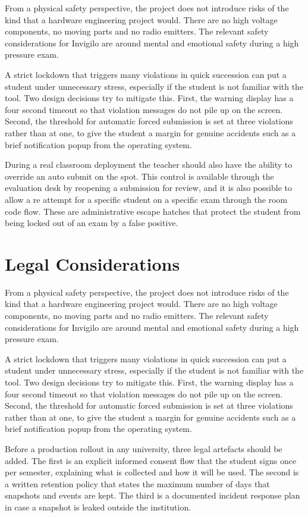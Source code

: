 \documentclass[12pt, a4paper]{report}
\begin{document}
\begin{justify}
  {\fontsize{12}{18}\selectfont
    From a physical safety perspective, the project does not introduce risks of the kind that a hardware engineering project would. There are no high voltage components, no moving parts and no radio emitters. The relevant safety considerations for Invigilo are around mental and emotional safety during a high pressure exam.

    A strict lockdown that triggers many violations in quick succession can put a student under unnecessary stress, especially if the student is not familiar with the tool. Two design decisions try to mitigate this. First, the warning display has a four second timeout so that violation messages do not pile up on the screen. Second, the threshold for automatic forced submission is set at three violations rather than at one, to give the student a margin for genuine accidents such as a brief notification popup from the operating system.

    During a real classroom deployment the teacher should also have the ability to override an auto submit on the spot. This control is available through the evaluation desk by reopening a submission for review, and it is also possible to allow a re attempt for a specific student on a specific exam through the room code flow. These are administrative escape hatches that protect the student from being locked out of an exam by a false positive.
  }
\end{justify}

\section{Legal Considerations}

\begin{justify}
  {\fontsize{12}{18}\selectfont
    From a physical safety perspective, the project does not introduce risks of the kind that a hardware engineering project would. There are no high voltage components, no moving parts and no radio emitters. The relevant safety considerations for Invigilo are around mental and emotional safety during a high pressure exam.

    A strict lockdown that triggers many violations in quick succession can put a student under unnecessary stress, especially if the student is not familiar with the tool. Two design decisions try to mitigate this. First, the warning display has a four second timeout so that violation messages do not pile up on the screen. Second, the threshold for automatic forced submission is set at three violations rather than at one, to give the student a margin for genuine accidents such as a brief notification popup from the operating system.

    Before a production rollout in any university, three legal artefacts should be added. The first is an explicit informed consent flow that the student signs once per semester, explaining what is collected and how it will be used. The second is a written retention policy that states the maximum number of days that snapshots and events are kept. The third is a documented incident response plan in case a snapshot is leaked outside the institution.
  }
\end{justify}
\end{document}
